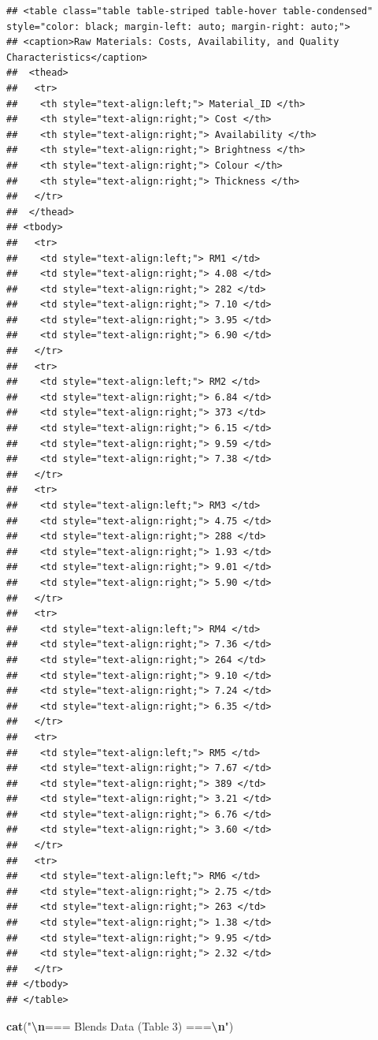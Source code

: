 \documentclass[
]{article}
\newenvironment{Shaded}{\begin{snugshade}}{\end{snugshade}}
\newcommand{\FunctionTok}[1]{\textcolor[rgb]{0.13,0.29,0.53}{\textbf{#1}}}
\newcommand{\NormalTok}[1]{#1}
\newcommand{\SpecialCharTok}[1]{\textcolor[rgb]{0.81,0.36,0.00}{\textbf{#1}}}
\newcommand{\StringTok}[1]{\textcolor[rgb]{0.31,0.60,0.02}{#1}}
\begin{document}
\begin{verbatim}
## <table class="table table-striped table-hover table-condensed" style="color: black; margin-left: auto; margin-right: auto;">
## <caption>Raw Materials: Costs, Availability, and Quality Characteristics</caption>
##  <thead>
##   <tr>
##    <th style="text-align:left;"> Material_ID </th>
##    <th style="text-align:right;"> Cost </th>
##    <th style="text-align:right;"> Availability </th>
##    <th style="text-align:right;"> Brightness </th>
##    <th style="text-align:right;"> Colour </th>
##    <th style="text-align:right;"> Thickness </th>
##   </tr>
##  </thead>
## <tbody>
##   <tr>
##    <td style="text-align:left;"> RM1 </td>
##    <td style="text-align:right;"> 4.08 </td>
##    <td style="text-align:right;"> 282 </td>
##    <td style="text-align:right;"> 7.10 </td>
##    <td style="text-align:right;"> 3.95 </td>
##    <td style="text-align:right;"> 6.90 </td>
##   </tr>
##   <tr>
##    <td style="text-align:left;"> RM2 </td>
##    <td style="text-align:right;"> 6.84 </td>
##    <td style="text-align:right;"> 373 </td>
##    <td style="text-align:right;"> 6.15 </td>
##    <td style="text-align:right;"> 9.59 </td>
##    <td style="text-align:right;"> 7.38 </td>
##   </tr>
##   <tr>
##    <td style="text-align:left;"> RM3 </td>
##    <td style="text-align:right;"> 4.75 </td>
##    <td style="text-align:right;"> 288 </td>
##    <td style="text-align:right;"> 1.93 </td>
##    <td style="text-align:right;"> 9.01 </td>
##    <td style="text-align:right;"> 5.90 </td>
##   </tr>
##   <tr>
##    <td style="text-align:left;"> RM4 </td>
##    <td style="text-align:right;"> 7.36 </td>
##    <td style="text-align:right;"> 264 </td>
##    <td style="text-align:right;"> 9.10 </td>
##    <td style="text-align:right;"> 7.24 </td>
##    <td style="text-align:right;"> 6.35 </td>
##   </tr>
##   <tr>
##    <td style="text-align:left;"> RM5 </td>
##    <td style="text-align:right;"> 7.67 </td>
##    <td style="text-align:right;"> 389 </td>
##    <td style="text-align:right;"> 3.21 </td>
##    <td style="text-align:right;"> 6.76 </td>
##    <td style="text-align:right;"> 3.60 </td>
##   </tr>
##   <tr>
##    <td style="text-align:left;"> RM6 </td>
##    <td style="text-align:right;"> 2.75 </td>
##    <td style="text-align:right;"> 263 </td>
##    <td style="text-align:right;"> 1.38 </td>
##    <td style="text-align:right;"> 9.95 </td>
##    <td style="text-align:right;"> 2.32 </td>
##   </tr>
## </tbody>
## </table>
\end{verbatim}

\begin{Shaded}
\begin{Highlighting}[]
\FunctionTok{cat}\NormalTok{(}\StringTok{"}\SpecialCharTok{\textbackslash{}n}\StringTok{=== Blends Data (Table 3) ===}\SpecialCharTok{\textbackslash{}n}\StringTok{"}\NormalTok{)}
\end{Highlighting}
\end{Shaded}
\end{document}
